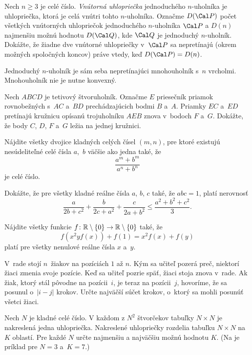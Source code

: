 {%
Nech $n\ge 3$ je celé číslo. {\it Vnútorná uhlopriečka\/} jednoduchého $n$-uholníka je uhlopriečka, ktorá je celá vnútri tohto $n$-uholníka. Označme $D(\Cal P)$ počet všetkých vnútorných uhlopriečok jednoduchého $n$-uholníka $\Cal P$ a $D(n)$ najmenšiu možnú hodnotu $D(\Cal Q)$, kde $\Cal Q$ je jednoduchý $n$-uholník. Dokážte, že žiadne dve vnútorné uhlopriečky v~$\Cal P$ sa nepretínajú (okrem možných spoločných koncov) práve vtedy, keď $D(\Cal P)=D(n)$.

\poznamka
Jednoduchý $n$-uholník je sám seba nepretínajúci mnohouholník s~$n$ vrcholmi. Mnohouholník nie je nutne konvexný.
}

{%
Nech $ABCD$ je tetivový štvoruholník. Označme $E$ priesečník priamok rovnobežných s~$AC$ a~$BD$ prechádzajúcich bodmi $B$ a~$A$. Priamky $EC$ a~$ED$ pretínajú kružnicu opísanú trojuholníku $AEB$ znova v~bodoch $F$ a~$G$. Dokážte, že body $C$, $D$, $F$ a~$G$ ležia na jednej kružnici.}

{%
Nájdite všetky dvojice kladných celých čísel $(m, n)$, pre ktoré existujú nesúdeliteľné celé čísla $a$,~$b$ väčšie ako jedna také, že
$$
\frac{a^m + b^m}{a^n + b^n}
$$
je celé číslo.}

{%
Dokážte, že pre všetky kladné reálne čísla $a$, $b$, $c$ také, že $abc = 1$, platí nerovnosť
$$
\frac{a}{2b + c^2} + \frac{b}{2c + a^2} + \frac{c}{2a + b^2} \le \frac{a^2 + b^2 + c^2}{3}.
$$}

{%
Nájdite všetky funkcie $f\colon\Bbb R\setminus\{0\}\to\Bbb R\setminus\{0\}$ také, že
$$
f(x^2yf(x)) + f(1)= x^2f(x)+f(y)
$$
platí pre všetky nenulové reálne čísla $x$ a~$y$.}

{%
V~rade stojí $n$~žiakov na pozíciách $1$ až $n$. Kým sa učiteľ pozerá preč, niektorí žiaci zmenia svoje pozície. Keď sa učiteľ pozrie späť, žiaci stoja znova v~rade. Ak žiak, ktorý stál pôvodne na pozícii~$i$, je teraz na pozícii~$j$, hovoríme, že sa posunul o~$|i-j|$ krokov. Určte najväčší súčet krokov, o~ktorý sa mohli posunúť všetci žiaci.}

{%
Nech $N$ je kladné celé číslo. V každom z $N^2$ štvorčekov tabuľky $N\times N$ je nakreslená jedna uhlopriečka. Nakreslené uhlopriečky rozdelia tabuľku  $N\times N$ na $K$ oblastí. Pre každé $N$ určte najmenšiu a najväčšiu možnú hodnotu $K$. (Na \obr{} je príklad pre $N = 3$ a~$K = 7$.)
%
}

